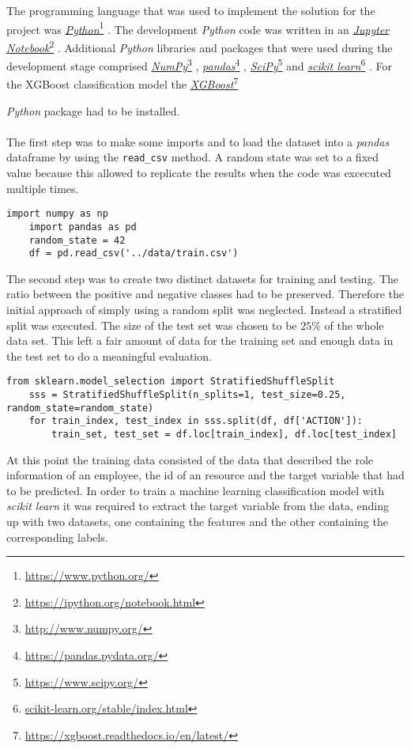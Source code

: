 \documentclass[11pt]{article}
\newcommand\fnurl[2]{%
\href{#2}{#1}\footnote{\url{#2}}%
}
\begin{document}
The programming language that was used to implement the solution for the project
was \fnurl{{\it Python}}{https://www.python.org/}. The development {\it Python}
code was written in an \fnurl{{\it Jupyter Notebook}}{https://ipython.org/notebook.html}.
Additional {\it Python} libraries and packages that were used during the development
stage comprised \fnurl{{\it NumPy}}{http://www.numpy.org/},
\fnurl{{\it pandas}}{https://pandas.pydata.org/},
\fnurl{{\it SciPy}}{https://www.scipy.org/} and 
\fnurl{{\it scikit learn}}{scikit-learn.org/stable/index.html}. For the XGBoost
classification model the \fnurl{{\it XGBoost}}{https://xgboost.readthedocs.io/en/latest/} 
{\it Python} package had to be installed. 
\\ \\
The first step was to make some imports and to load the dataset into 
a {\it pandas} dataframe by using the {\tt read\_csv} method. A random state was set
to a fixed value because this allowed to replicate the results
when the code was excecuted multiple times.
\begin{lstlisting}[frame=single]
    import numpy as np
    import pandas as pd
    random_state = 42
    df = pd.read_csv('../data/train.csv')
\end{lstlisting}
\noindent  
The second step was to create two distinct datasets for training and testing.
The ratio between the positive and negative classes had to be preserved.
Therefore the initial approach of simply using a random split was neglected.
Instead a stratified split was executed. The size of the test set was chosen
to be $25 \%$ of the whole data set. This left a fair amount of data for 
the training set and enough data in the test set to do a meaningful evaluation.

\begin{lstlisting}[frame=single]
    from sklearn.model_selection import StratifiedShuffleSplit
    sss = StratifiedShuffleSplit(n_splits=1, test_size=0.25, random_state=random_state)
    for train_index, test_index in sss.split(df, df['ACTION']):
        train_set, test_set = df.loc[train_index], df.loc[test_index]
\end{lstlisting}
\noindent
At this point the training data consisted of the data that described the role
information of an employee, the id of an resource and the target variable
that had to be predicted. In order to train a machine learning classification
model with {\it scikit learn} it was required to extract the target variable
from the data, ending up with two datasets,  one containing
the features and the other containing the corresponding labels.
\end{document}
